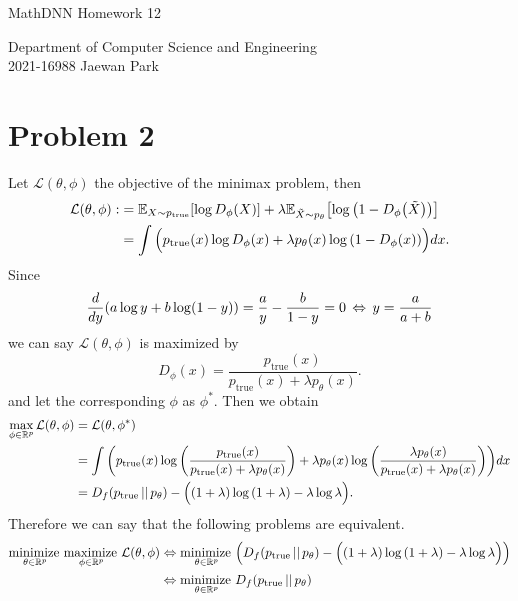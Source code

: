 \documentclass[10pt]{article}
\DeclareMathOperator*{\minimize}{minimize\,}
\DeclareMathOperator*{\maximize}{maximize\,}
\begin{document}
\begin{center}
    {\LARGE MathDNN Homework 12} \\
\end{center}
\begin{flushright}
    Department of Computer Science and Engineering \\
    2021-16988 Jaewan Park
\end{flushright}

\section*{Problem 2}
Let $\mathcal{L}(\theta, \phi)$ the objective of the minimax problem, then
\begin{align*}
    \mathcal{L}(\theta, \phi) :&= \mathbb{E}_{X \sim p_{\mathrm{true}}}\qty[\log D_\phi(X)] + \lambda\mathbb{E}_{\tilde{X} \sim p_\theta}\qty[\log\qty(1 - D_\phi\qty(\tilde{X}))] \\
    &= \int\Big(p_{\mathrm{true}}(x)\log D_\phi(x) + \lambda p_\theta(x)\log\qty(1 - D_\phi\qty(x))\Big)dx.
\end{align*}
Since 
$$\frac{d}{dy}\qty(a\log{y} + b\log(1-y)) = \frac{a}{y} - \frac{b}{1-y} = 0 \,\Leftrightarrow\, y = \frac{a}{a+b}$$
we can say $\mathcal{L}(\theta, \phi)$ is maximized by 
$$D_\phi(x) = \frac{p_{\mathrm{true}}(x)}{p_{\mathrm{true}}(x) + \lambda p_\theta(x)}.$$
and let the corresponding $\phi$ as $\phi^*$. Then we obtain
\begin{align*}
    \max_{\phi \in \mathbb{R}^p}\mathcal{L}(\theta, \phi) &= \mathcal{L}\qty(\theta, \phi^*) \\
    &= \int\qty(p_{\mathrm{true}}(x)\log\qty(\frac{p_{\mathrm{true}}(x)}{p_{\mathrm{true}}(x) + \lambda p_\theta(x)}) + \lambda p_\theta(x)\log\qty(\frac{\lambda p_{\theta}(x)}{p_{\mathrm{true}}(x) + \lambda p_\theta(x)}))dx \\
    &= D_f\qty(p_{\mathrm{true}} \,||\, p_\theta) - \Big(\qty(1+\lambda)\log\qty(1+\lambda) - \lambda\log\lambda\Big).
\end{align*}
Therefore we can say that the following problems are equivalent.
\begin{align*}
    \minimize_{\theta \in \mathbb{R}^p}\maximize_{\phi \in \mathbb{R}^p}\mathcal{L}(\theta, \phi) &\Leftrightarrow \minimize_{\theta \in \mathbb{R}^p}\qty(D_f\qty(p_{\mathrm{true}} \,||\, p_\theta) - \Big(\qty(1+\lambda)\log\qty(1+\lambda) - \lambda\log\lambda\Big)) \\
    &\Leftrightarrow \minimize_{\theta \in \mathbb{R}^p}D_f\qty(p_{\mathrm{true}} \,||\, p_\theta)
\end{align*}
\end{document}
